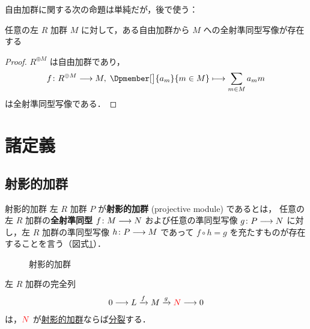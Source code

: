 \documentclass[algtopo_main]{subfiles}
\begin{document}
自由加群に関する次の命題は単純だが，後で使う：

\begin{myprop}[label=prop:free-mod-surjection]{}
    任意の左 $R$ 加群 $M$ に対して，ある自由加群から $M$ への全射準同型写像が存在する
\end{myprop}

\begin{proof}
    $R^{\oplus M}$ は自由加群であり，
    \begin{align}
        f \colon R^{\oplus M} \lto M,\; \Dpmember[\big]{a_m}{m \in M} \lmto \sum_{m \in M} a_m m
    \end{align}
    は全射準同型写像である．
\end{proof}


\section{諸定義}

\subsection{射影的加群}

\begin{mydef}[label=def:proj-mod]{射影的加群}
    左 $R$ 加群 $P$ が\textbf{射影的加群} (projective module) であるとは，
    任意の左 $R$ 加群の\textbf{全射準同型} $f\colon M \longrightarrow N$ および任意の準同型写像 $g \colon P \longrightarrow N$ に対し，左 $R$ 加群の準同型写像 $ h \colon P \longrightarrow M$ であって $f \circ h = g$ を充たすものが存在することを言う（図式\ref{fig:proj-mod}）．
\end{mydef}

\begin{figure}[H]
    \centering
    \caption{射影的加群}
    \label{fig:proj-mod}
\end{figure}%

\begin{myprop}[label=prop:proj-mod-split]{}
    左 $R$ 加群の完全列
    \begin{align}
        0 \longrightarrow L \xrightarrow{f} M \xrightarrow{g} \textcolor{red}{N} \longrightarrow 0
    \end{align}
    は，$\textcolor{red}{N}$ が\hyperref[def:proj-mod]{射影的加群}ならば\hyperref[def:split]{分裂}する．
\end{myprop}
\end{document}
